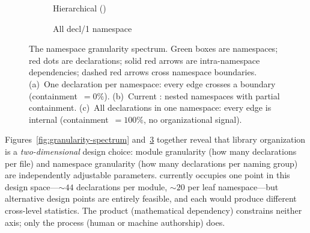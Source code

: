 \begin{figure}[ht]
\begin{subfigure}[b]{0.36\textwidth}
\caption{Hierarchical ()}
\label{fig:ns-gran-current}
\end{subfigure}%
\hfill
\begin{subfigure}[b]{0.30\textwidth}
\centering
{}
\caption{All decl/1 namespace}
\label{fig:ns-gran-single}
\end{subfigure}
\caption{The namespace granularity spectrum. \textcolor{green!50!black}{Green boxes} are namespaces; \textcolor{red!70!black}{red dots} are declarations; \textcolor{red!70!black}{solid red arrows} are intra-namespace dependencies; \textcolor{red!70!black}{dashed red arrows} cross namespace boundaries. (a)~One declaration per namespace: every edge crosses a boundary (containment~$= 0\%$). (b)~Current : nested namespaces with partial containment. (c)~All declarations in one namespace: every edge is internal (containment~$= 100\%$, no organizational signal).}
\label{fig:ns-granularity-spectrum}
\end{figure}

Figures~\ref{fig:granularity-spectrum} and~\ref{fig:ns-granularity-spectrum} together reveal that library organization is a \emph{two-dimensional} design choice: module granularity (how many declarations per file) and namespace granularity (how many declarations per naming group) are independently adjustable parameters.  currently occupies one point in this design space---${\sim}44$ declarations per module, ${\sim}20$ per leaf namespace---but alternative design points are entirely feasible, and each would produce different cross-level statistics. The product (mathematical dependency) constrains neither axis; only the process (human or machine authorship) does.
